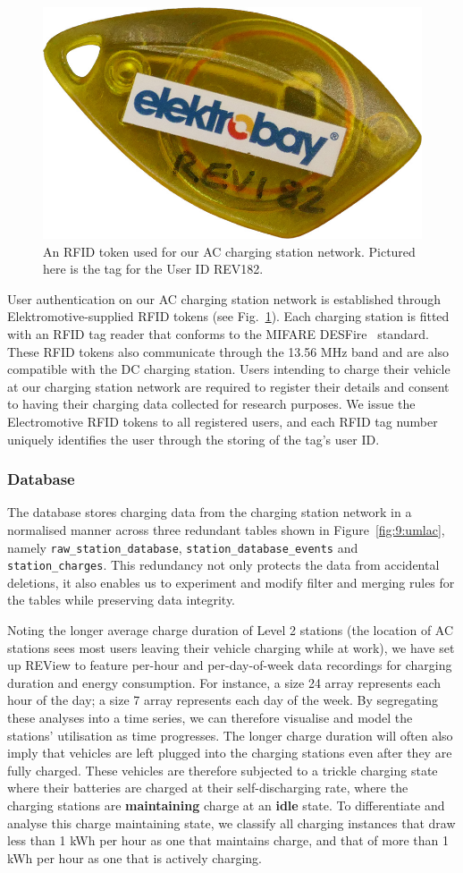 \begin{figure}[H]
	\centering
	\includegraphics[width=0.35\linewidth]{tag}
	\caption[An RFID token used for our AC charging station network]{An RFID token used for our AC charging station network. Pictured here is the tag for the User ID REV182.}
	\label{fig:9:actag}
\end{figure}

User authentication on our AC charging station network is established through Elektromotive-supplied RFID tokens (see Fig.~\ref{fig:9:actag}). Each charging station is fitted with an RFID tag reader that conforms to the MIFARE DESFire~\cite{nxp_semiconductors_mifare_nodate} standard. These RFID tokens also communicate through the 13.56 MHz band and are also compatible with the DC charging station. Users intending to charge their vehicle at our charging station network are required to register their details and consent to having their charging data collected for research purposes. We issue the Electromotive RFID tokens to all registered users, and each RFID tag number uniquely identifies the user through the storing of the tag’s user ID.

\subsubsection{Database}
The database stores charging data from the charging station network in a normalised manner across three redundant tables shown in Figure~\ref{fig:9:umlac}, namely \texttt{raw\_station\_database}, \texttt{station\_database\_events} and \texttt{station\_charges}. This redundancy not only protects the data from accidental deletions, it also enables us to experiment and modify filter and merging rules for the tables while preserving data integrity. 

Noting the longer average charge duration of Level 2 stations (the location of AC stations sees most users leaving their vehicle charging while at work), we have set up REView to feature per-hour and per-day-of-week data recordings for charging duration and energy consumption. For instance, a size 24 array represents each hour of the day; a size 7 array represents each day of the week. By segregating these analyses into a time series, we can therefore visualise and model the stations’ utilisation as time progresses. The longer charge duration will often also imply that vehicles are left plugged into the charging stations even after they are fully charged. These vehicles are therefore subjected to a trickle charging state where their batteries are charged at their self-discharging rate, where the charging stations are \textbf{maintaining} charge at an \textbf{idle} state. To differentiate and analyse this charge maintaining state, we classify all charging instances that draw less than 1 kWh per hour as one that maintains charge, and that of more than 1 kWh per hour as one that is actively charging. 

